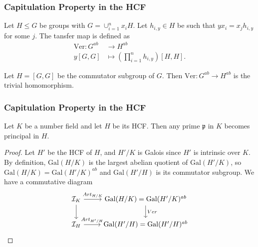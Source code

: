 \documentclass{beamer}
\newcommand{\Gal}{\mathrm{Gal}}
\newcommand{\Cl}{\mathrm{Cl}}
\newcommand{\pp}{\mathfrak{p}}
\newcommand{\af}{\mathfrak{a}}
\theoremstyle{plain}
\begin{document}
\begin{frame}
    \frametitle{Capitulation Property in the HCF}
    \begin{definition}
        Let $H\leq G$ be groups with $G=\cup_{i=1}^n x_iH$. Let $h_{i,y}\in H$ be such that $yx_i=x_jh_{i,y}$ for some $j$. The tansfer map is defined as
        \begin{align*}
            \mathrm{Ver}:G^{ab} &\longrightarrow H^{ab} \\
            y[G,G]&\longmapsto \left(\prod_{i=1}^nh_{i,y}\right)[H,H].
        \end{align*}
    \end{definition}

    \begin{theorem}
        Let $H=[G,G]$ be the commutator subgroup of $G$. Then $\mathrm{Ver}:G^{ab}\to H^{ab}$ is the trivial homomorphism.
    \end{theorem}
\end{frame}

\begin{frame}[fragile]
    \frametitle{Capitulation Property in the HCF}
    \begin{theorem}
        Let $K$ be a number field and let $H$ be its HCF. Then any prime $\pp$ in $K$ becomes principal in $H$.
    \end{theorem}
    \begin{proof}
        Let $H'$ be the HCF of $H$, and $H'/K$ is Galois since $H'$ is intrinsic over $K$. By definition, $\Gal(H/K)$ is the largest abelian quotient of $\Gal(H'/K)$, so $\Gal(H/K)=\Gal(H'/K)^{ab}$ and $\Gal(H'/H)$ is its commutator subgroup. We have a commutative diagram
        \[
        \begin{tikzcd}
            \mathcal{I}_K \arrow[r,"Art_{H/K}"] \arrow[d,""] & \Gal(H/K)=\Gal(H'/K)^{ab} \arrow[d,"Ver"] \\
            \mathcal{I}_H \arrow[r,"Art_{H'/H}"] & \Gal(H'/H)=\Gal(H'/H)^{ab}
        \end{tikzcd}
        \]

    \end{proof}
    
\end{frame}
    
\end{document}
